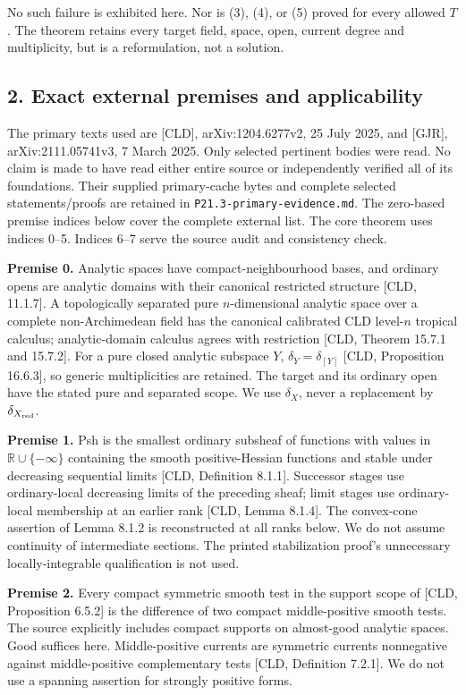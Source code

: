 \documentclass[
  11pt,
]{article}
\begin{document}
No such failure is exhibited here. Nor is (3), (4), or (5) proved for
every allowed \(T\). The theorem retains every target field, space,
open, current degree and multiplicity, but is a reformulation, not a
solution.

\subsection{2. Exact external premises and
applicability}\label{exact-external-premises-and-applicability}

The primary texts used are {[}CLD{]}, arXiv:1204.6277v2, 25 July 2025,
and {[}GJR{]}, arXiv:2111.05741v3, 7 March 2025. Only selected pertinent
bodies were read. No claim is made to have read either entire source or
independently verified all of its foundations. Their supplied
primary-cache bytes and complete selected statements/proofs are retained
in \texttt{P21.3-primary-evidence.md}. The zero-based premise indices
below cover the complete external list. The core theorem uses indices
0--5. Indices 6--7 serve the source audit and consistency check.

\textbf{Premise 0.} Analytic spaces have compact-neighbourhood bases,
and ordinary opens are analytic domains with their canonical restricted
structure {[}CLD, 11.1.7{]}. A topologically separated pure
\(n\)-dimensional analytic space over a complete non-Archimedean field
has the canonical calibrated CLD level-\(n\) tropical calculus;
analytic-domain calculus agrees with restriction {[}CLD, Theorem 15.7.1
and 15.7.2{]}. For a pure closed analytic subspace \(Y\),
\(\delta_Y=\delta_{[Y]}\) {[}CLD, Proposition 16.6.3{]}, so generic
multiplicities are retained. The target and its ordinary open have the
stated pure and separated scope. We use \(\delta_X\), never a
replacement by \(\delta_{X_{\rm red}}\).

\textbf{Premise 1.} Psh is the smallest ordinary subsheaf of functions
with values in \(\mathbb R\cup\{-\infty\}\) containing the smooth
positive-Hessian functions and stable under decreasing sequential limits
{[}CLD, Definition 8.1.1{]}. Successor stages use ordinary-local
decreasing limits of the preceding sheaf; limit stages use
ordinary-local membership at an earlier rank {[}CLD, Lemma 8.1.4{]}. The
convex-cone assertion of Lemma 8.1.2 is reconstructed at all ranks
below. We do not assume continuity of intermediate sections. The printed
stabilization proof's unnecessary locally-integrable qualification is
not used.

\textbf{Premise 2.} Every compact symmetric smooth test in the support
scope of {[}CLD, Proposition 6.5.2{]} is the difference of two compact
middle-positive smooth tests. The source explicitly includes compact
supports on almost-good analytic spaces. Good suffices here.
Middle-positive currents are symmetric currents nonnegative against
middle-positive complementary tests {[}CLD, Definition 7.2.1{]}. We do
not use a spanning assertion for strongly positive forms.
\end{document}
